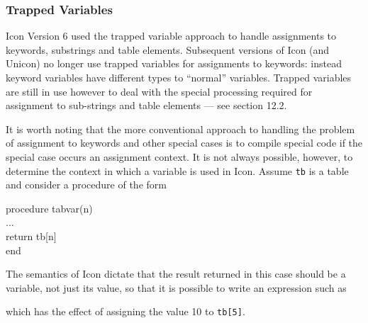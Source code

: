\subsubsection{Trapped Variables}

Icon Version 6 used the trapped variable approach to handle assignments to
keywords, substrings and table elements. Subsequent versions of Icon (and
Unicon) no longer use trapped variables for assignments to keywords:
instead keyword variables have different types to ``normal''
variables. Trapped variables are still in use however to deal with the
special processing required for assignment to sub-strings and table
elements --- see section 12.2.



It is worth noting that the more conventional approach to handling the
problem of assignment to keywords and other special cases is to compile
special code if the special case occurs an assignment context. It is not
always possible, however, to determine the context in which a variable is
used in Icon. Assume \texttt{tb} is a table and consider a procedure of the form

\begin{iconcode}
\>procedure tabvar(n)\\
\> ...\\
\>return tb[n]\\
\>end
\end{iconcode}

The semantics of Icon dictate that the result returned in this case
should be a variable, not just its value, so that it is possible to
write an expression such as


\noindent
which has the effect of assigning the value 10 to \texttt{tb[5]}.

